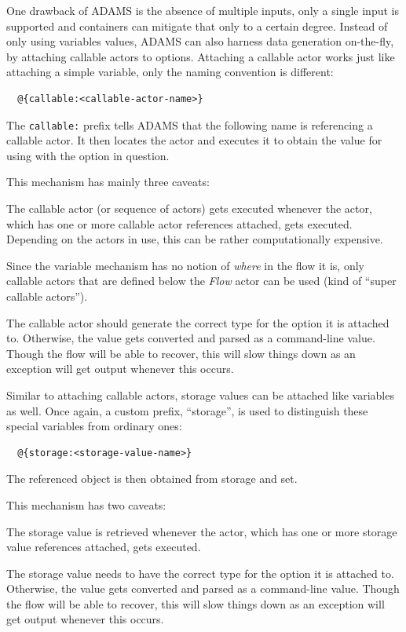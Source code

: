One drawback of ADAMS is the absence of multiple inputs, only a single input is
supported and containers can mitigate that only to a certain degree. Instead of
only using variables values, ADAMS can also harness data generation on-the-fly,
by attaching callable actors to options. Attaching a callable actor works just like
attaching a simple variable, only the naming convention is different:
\begin{verbatim}
  @{callable:<callable-actor-name>}
\end{verbatim}
The \texttt{callable:} prefix tells ADAMS that the following name is referencing a
callable actor. It then locates the actor and executes it to obtain the value for
using with the option in question.

This mechanism has mainly three caveats:
\begin{tight_itemize}
	\item The callable actor (or sequence of actors) gets executed whenever the
	actor, which has one or more callable actor references attached, gets executed.
	Depending on the actors in use, this can be rather computationally expensive.
	\item Since the variable mechanism has no notion of \textit{where} in the flow
	it is, only callable actors that are defined below the \textit{Flow} actor can be
	used (kind of ``super callable actors'').
	\item The callable actor should generate the correct type for the option it is
	attached to. Otherwise, the value gets converted and parsed as a command-line
	value. Though the flow will be able to recover, this will slow things down
	as an exception will get output whenever this occurs.
\end{tight_itemize}

Similar to attaching callable actors, storage values can be attached like
variables as well. Once again, a custom prefix, ``storage'', is used to
distinguish these special variables from ordinary ones:
\begin{verbatim}
  @{storage:<storage-value-name>}
\end{verbatim}
The referenced object is then obtained from storage and set.

This mechanism has two caveats:
\begin{tight_itemize}
	\item The storage value is retrieved whenever the actor, which has one or more
	storage value references attached, gets executed.
	\item The storage value needs to have the correct type for the option it is
	attached to. Otherwise, the value gets converted and parsed as a command-line
	value. Though the flow will be able to recover, this will slow things down
	as an exception will get output whenever this occurs.
\end{tight_itemize}

